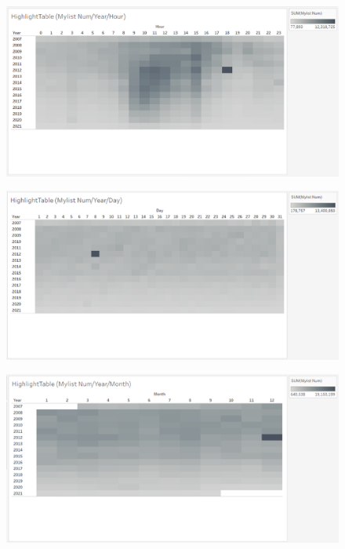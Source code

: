 \documentclass[submit,techrep,noauthor]{ipsj}
\begin{document}
\vspace{-1.5zh}
\begin{figure}[h]
  \begin{minipage}[b]{0.49\columnwidth}
    \centering
    \includegraphics[width=\columnwidth]{./eps/HighlightTable_MylistNum_YearHour.eps}
    \label{fig:highlighttable_mylistnum_yearhour}
  \end{minipage}
  \begin{minipage}[b]{0.49\columnwidth}
    \centering
    \includegraphics[width=\columnwidth]{./eps/HighlightTable_MylistNum_YearDay.eps}
    \label{fig:highlighttable_mylistnum_yearday}
  \end{minipage}
  \begin{minipage}[b]{0.49\columnwidth}
    \centering
    \includegraphics[width=\columnwidth]{./eps/HighlightTable_MylistNum_YearMonth.eps}

\end{minipage}
\end{figure}
\end{document}
